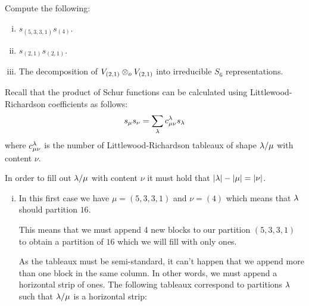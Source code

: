 \documentclass[12pt]{memoir}
\begin{document}
\begin{Ej}[Exercise 2]
    Compute the following:\vspace{-0.4em}
    \begin{enumerate}[i)]
        \itemsep=-0.4em
        \item $s_{(5,3,3,1)}s_{(4)}$.
        \item $s_{(2,1)}s_{(2,1)}$.
        \item The decomposition of $V_{(2,1)}\otimes_oV_{(2,1)}$ into irreducible $S_6$ representations.
    \end{enumerate}
\end{Ej}

\begin{ptcbr}
    Recall that the product of Schur functions can be calculated using Littlewood-Richardson coefficients as follows:
    $$s_\mu s_\nu=\sum_{\lambda}c^\lambda_{\mu\nu}s_\lambda$$
    where $c^{\lambda}_{\mu\nu}$ is the number of Littlewood-Richardson tableaux of shape $\lambda/\mu$ with content $\nu$.\par 
    In order to fill out $\lambda/\mu$ with content $\nu$ it must hold that $|\lambda|-|\mu|=|\nu|$.
    \begin{enumerate}[i)]
        \itemsep=-0.4em
        \item In this first case we have $\mu=(5,3,3,1)$ and $\nu=(4)$ which means that $\lambda$ should partition $16$.\par 
        This means that we must append 4 new blocks to our partition $(5,3,3,1)$ to obtain a partition of $16$ which we will fill with only ones.\par 
        As the tableaux must be semi-standard, it can't happen that we append more than one block in the same column. In other words, we must append a horizontal strip of ones. The following tableaux correspond to partitions $\lambda$ such that $\lambda/\mu$ is a horizontal strip:
        \begin{itemize}
\end{itemize}
\end{enumerate}
\end{ptcbr}
\end{document}
